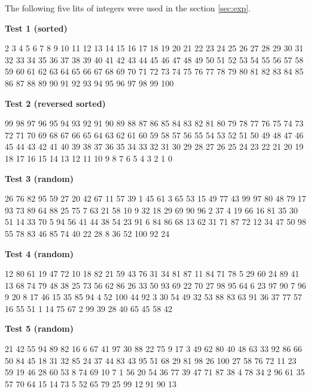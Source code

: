 The following five lits of integers were used in the section \ref{sec:exp}.

\noindent\textbf{Test 1 (sorted)}

 2 3 4 5 6 7 8 9 10 11 12 13 14 15 16 17 18 19 20 21 22 23 24 25 26 27 28 29 30 31 32 33 34 35 36 37 38 39 40 41 42 43 44 45 46 47 48 49 50 51 52 53 54 55 56 57 58 59 60 61 62 63 64 65 66 67 68 69 70 71 72 73 74 75 76 77 78 79 80 81 82 83 84 85 86 87 88 89 90 91 92 93 94 95 96 97 98 99 100

\noindent\textbf{Test 2 (reversed sorted)}

 99 98 97 96 95 94 93 92 91 90 89 88 87 86 85 84 83 82 81 80 79 78 77 76 75 74 73 72 71 70 69 68 67 66 65 64 63 62 61 60 59 58 57 56 55 54 53 52 51 50 49 48 47 46 45 44 43 42 41 40 39 38 37 36 35 34 33 32 31 30 29 28 27 26 25 24 23 22 21 20 19 18 17 16 15 14 13 12 11 10 9 8 7 6 5 4 3 2 1 0



\noindent\textbf{Test 3 (random)}

 26 76 82 95 59 27 20 42 67 11 57 39 1 45 61 3 65 53 15 49 77 43 99 97 80 48 79 17 93 73 89 64 88 25 75 7 63 21 58 10 9 32 18 29 69 90 96 2 37 4 19 66 16 81 35 30 51 14 33 70 5 94 56 41 44 38 54 23 91 6 84 86 68 13 62 31 71 87 72 12 34 47 50 98 55 78 83 46 85 74 40 22 28 8 36 52 100 92 24



\noindent\textbf{Test 4 (random)}

 12 80 61 19 47 72 10 18 82 21 59 43 76 31 34 81 87 11 84 71 78 5 29 60 24 89 41 13 68 74 79 48 38 25 73 56 62 86 26 33 50 93 69 22 70 27 98 95 64 6 23 97 90 7 96 9 20 8 17 46 15 35 85 94 4 52 100 44 92 3 30 54 49 32 53 88 83 63 91 36 37 77 57 16 55 51 1 14 75 67 2 99 39 28 40 65 45 58 42

\noindent\textbf{Test 5 (random)}

 21 42 55 94 89 82 16 6 67 41 97 30 88 22 75 9 17 3 49 62 80 40 48 63 33 92 86 66 50 84 45 18 31 32 85 24 37 44 83 43 95 51 68 29 81 98 26 100 27 58 76 72 11 23 59 19 46 28 60 53 8 74 69 10 7 1 56 20 54 36 77 39 47 71 87 38 4 78 34 2 96 61 35 57 70 64 15 14 73 5 52 65 79 25 99 12 91 90 13